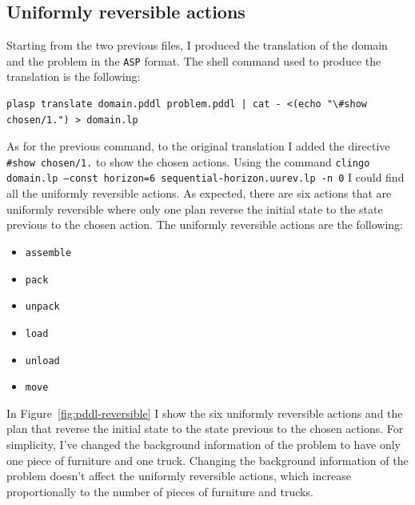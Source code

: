 \documentclass[12pt]{article}
\begin{document}
    \subsection{Uniformly reversible actions}\label{subsec:pddl-reversible}
    Starting from the two previous files, I produced the translation of the domain and the problem in the \texttt{ASP} format.
    The shell command used to produce the translation is the following:
\begin{verbatim}
plasp translate domain.pddl problem.pddl | cat - <(echo "\#show chosen/1.") > domain.lp
\end{verbatim}
    As for the previous command, to the original translation I added the directive \texttt{\#show chosen/1.} to show the chosen actions.
    Using the command \texttt{clingo domain.lp --const horizon=6 sequential-horizon.uurev.lp -n 0} I could find all the uniformly reversible actions.
    As expected, there are six actions that are uniformly reversible where only one plan reverse the initial state to the state previous to the chosen action.
    The uniformly reversible actions are the following:
    \begin{itemize}
        \item \texttt{assemble}
        \item \texttt{pack}
        \item \texttt{unpack}
        \item \texttt{load}
        \item \texttt{unload}
        \item \texttt{move}
    \end{itemize}
    In Figure~\ref{fig:pddl-reversible} I show the six uniformly reversible actions and the plan that reverse the initial state to the state previous to the chosen actions.
    For simplicity, I've changed the background information of the problem to have only one piece of furniture and one truck.
    Changing the background information of the problem doesn't affect the uniformly reversible actions, which increase proportionally to the number of pieces of furniture and trucks.
\end{document}
